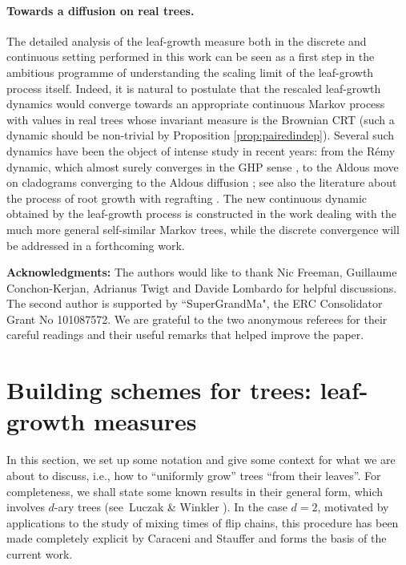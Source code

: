 \documentclass[11pt]{article}
\begin{document}
\paragraph{Towards a diffusion on real trees.} The detailed analysis of the leaf-growth measure both in the discrete and continuous setting performed in this work can be seen as a first step in the ambitious programme of understanding the scaling limit of the leaf-growth process itself. Indeed, it is natural to postulate that the rescaled leaf-growth dynamics would converge towards an appropriate continuous Markov process with values in real trees whose invariant measure is the Brownian CRT (such a dynamic should be non-trivial by Proposition \ref{prop:pairedindep}).  Several such dynamics have been the object of intense study in recent years: from the Rémy dynamic, which almost surely converges in the GHP sense \cite{CurienHaas}, to the Aldous move on cladograms converging to the Aldous diffusion \cite{lohr2020aldous,FPRW18,FPRW20,forman2023aldous}; see also the literature about the process of root growth with regrafting \cite{MR2221786}. The  new continuous dynamic obtained by the leaf-growth process is constructed in the work \cite{CFT25} dealing with the much more general self-similar Markov trees, while  the discrete convergence will be addressed in a forthcoming work.


 

\medskip \noindent \textbf{Acknowledgments:}  The authors would like to thank Nic Freeman, Guillaume Conchon-Kerjan, Adrianus Twigt and Davide Lombardo for helpful discussions. The second author is supported by ``SuperGrandMa", the  ERC Consolidator Grant No 101087572. We are grateful to the two anonymous referees for their careful readings and their useful remarks that helped improve the paper.

\section{Building schemes for trees: leaf-growth measures}\label{section:building schemes}

In this section, we set up some notation and give some context for what we are about to discuss, i.e., how to ``uniformly grow'' trees ``from their leaves''.  For completeness, we shall state some known results in their general form, which involves $d$-ary trees (see~Luczak \& Winkler  \cite{LW04}). In the case $d=2$, motivated by applications to the study of mixing times of flip chains, this procedure has been made completely explicit by Caraceni and Stauffer \cite{CS20} and forms the basis of the current work.
\end{document}
